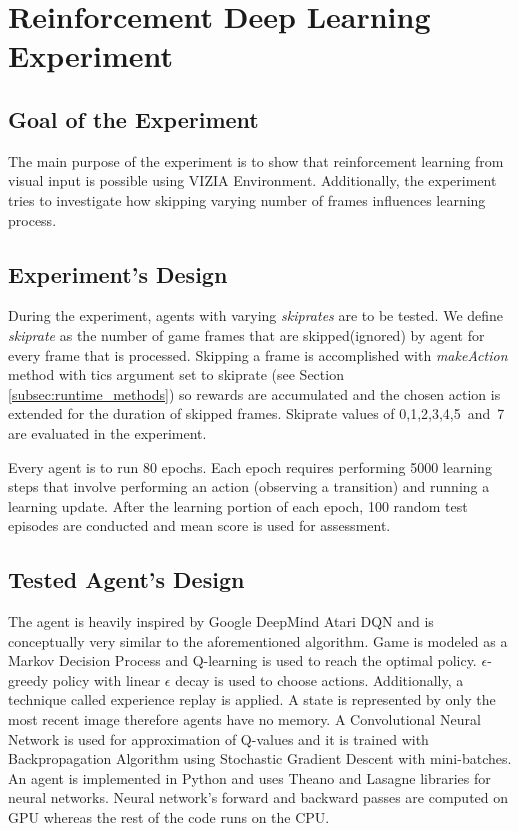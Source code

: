 \chapter{Reinforcement Deep Learning Experiment}\label{ch:experiment}

\section{Goal of the Experiment}
The main purpose of the experiment is to show that reinforcement learning from visual input is possible using VIZIA Environment. 	
Additionally, the experiment tries to investigate how skipping varying number of frames influences learning process.

\section{Experiment's Design}
During the experiment, agents with varying \emph{skiprates} are to be tested. We define \emph{skiprate} as the number of game frames that are skipped(ignored) by agent for every frame that is processed. Skipping a frame is accomplished with \emph{makeAction} method with tics argument set to skiprate (see Section \ref{subsec:runtime_methods}) so rewards are accumulated and the chosen action is extended for the duration of skipped frames. Skiprate values of 0,1,2,3,4,5~and~7 are evaluated in the experiment. 

Every agent is to run 80 epochs. Each epoch requires performing 5000 learning steps that involve performing an action (observing a transition) and running a learning update. After the learning portion of each epoch, 100 random test episodes are conducted and mean score is used for assessment.  

\section{Tested Agent's Design}
	The agent is heavily inspired by Google DeepMind Atari DQN \cite{mnih-dqn-2015}\cite{mnih-atari-2013} and is conceptually very similar to the aforementioned algorithm. Game is modeled as a Markov Decision Process and Q-learning \cite{watkins:mlj92} is used to reach the optimal policy. $\epsilon$-greedy policy with linear $\epsilon$ decay is used to choose actions. Additionally, a technique called experience replay \cite{mnih-dqn-2015} is applied. A state is represented by only the most recent image therefore agents have no memory. A Convolutional Neural Network is used for approximation of Q-values and it is trained with Backpropagation Algorithm \cite{lecun-98b} using Stochastic Gradient Descent with mini-batches. An agent is implemented in Python and uses Theano \cite{Bastien-Theano-2012}\cite{bergstra+al:2010-scipy} and Lasagne \cite{sander_dieleman_2015_27878} libraries for neural networks. Neural network's forward and backward passes are computed on GPU whereas the rest of the code runs on the CPU.

